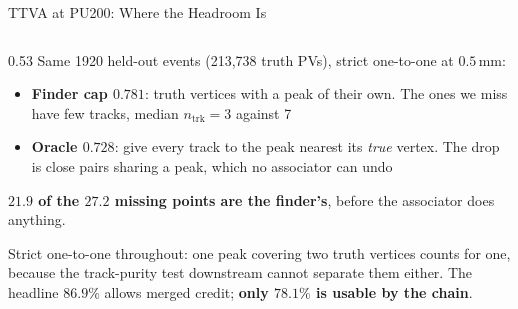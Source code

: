 \documentclass[xcolor=table,aspectratio=169]{beamer}
\newcommand{\ntrk}{\ensuremath{n_\mathrm{trk}}}
\begin{document}
\begin{frame}{TTVA at PU200: Where the Headroom Is}
\begin{columns}[c]
\begin{column}{0.53\linewidth}
            Same 1920 held-out events (213{,}738 truth PVs), strict one-to-one at
            $0.5$\,mm:
            \begin{itemize}
                \setlength\itemsep{0.25em}
                \item \textbf{Finder cap $0.781$}: truth vertices with a peak of their
                    own. The ones we miss have few tracks, median \(\ntrk{=}3\)
                    against 7
                \item \textbf{Oracle $0.728$}: give every track to the peak nearest its
                    \emph{true} vertex. The drop is close pairs sharing a peak, which no
                    associator can undo
            \end{itemize}
            \vspace{0.4em}
            \textcolor{pennred}{\textbf{$\mathbf{21.9}$ of the $\mathbf{27.2}$ missing
            points are the finder's}}, before the associator does anything.
            \vspace{0.3em}

            {\scriptsize\textcolor{black!55}{Strict one-to-one throughout: one peak
            covering two truth vertices counts for one, because the track-purity test
            downstream cannot separate them either. The headline $86.9\%$ allows merged
            credit; \textbf{only $78.1\%$ is usable by the chain}.}}
        \end{column}
    \end{columns}
\end{frame}
\end{document}
